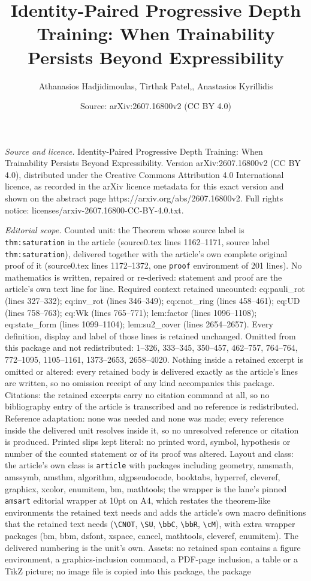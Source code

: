 \documentclass[10pt,a4paper]{amsart}
\title[Identity-Paired Progressive Depth Training: When Trainabilit]{Identity-Paired Progressive Depth Training: When Trainability Persists Beyond Expressibility}
\author{Athanasios Hadjidimoulas, Tirthak Patel,, Anastasios Kyrillidis}
\date{Source: arXiv:2607.16800v2 (CC BY 4.0)}
\begin{document}
\maketitle

\noindent\emph{Source and licence.} Identity-Paired Progressive Depth Training: When Trainability Persists Beyond Expressibility. Version arXiv:2607.16800v2 (CC BY 4.0), distributed under the Creative Commons Attribution 4.0 International licence, as recorded in the arXiv licence metadata for this exact version and shown on the abstract page https://arxiv.org/abs/2607.16800v2. Full rights notice: licenses/arxiv-2607.16800-CC-BY-4.0.txt.\par\smallskip

\noindent\textit{Editorial scope.} Counted unit: the Theorem whose source label is \texttt{thm:saturation} in the article (source0.tex lines 1162--1171, source label \texttt{thm:saturation}), delivered together with the article's own complete original proof of it (source0.tex lines 1172--1372, one \texttt{proof} environment of 201 lines). No mathematics is written, repaired or re-derived: statement and proof are the article's own text line for line. Required context retained uncounted: eq:pauli\_rot (lines 327--332); eq:inv\_rot (lines 346--349); eq:cnot\_ring (lines 458--461); eq:UD (lines 758--763); eq:Wk (lines 765--771); lem:factor (lines 1096--1108); eq:state\_form (lines 1099--1104); lem:su2\_cover (lines 2654--2657). Every definition, display and label of those lines is retained unchanged. Omitted from this package and not redistributed: 1--326, 333--345, 350--457, 462--757, 764--764, 772--1095, 1105--1161, 1373--2653, 2658--4020. Nothing inside a retained excerpt is omitted or altered: every retained body is delivered exactly as the article's lines are written, so no omission receipt of any kind accompanies this package. Citations: the retained excerpts carry no citation command at all, so no bibliography entry of the article is transcribed and no reference is redistributed. Reference adaptation: none was needed and none was made; every reference inside the delivered unit resolves inside it, so no unresolved reference or citation is produced. Printed slips kept literal: no printed word, symbol, hypothesis or number of the counted statement or of its proof was altered. Layout and class: the article's own class is \texttt{article} with packages including geometry, amsmath, amssymb, amsthm, algorithm, algpseudocode, booktabs, hyperref, cleveref, graphicx, xcolor, enumitem, bm, mathtools; the wrapper is the lane's pinned \texttt{amsart} editorial wrapper at 10pt on A4, which restates the theorem-like environments the retained text needs and adds the article's own macro definitions that the retained text needs (\texttt{\textbackslash CNOT}, \texttt{\textbackslash SU}, \texttt{\textbackslash bbC}, \texttt{\textbackslash bbR}, \texttt{\textbackslash cM}), with extra wrapper packages (bm, bbm, dsfont, xspace, cancel, mathtools, cleveref, enumitem). The delivered numbering is the unit's own. Assets: no retained span contains a figure environment, a graphics-inclusion command, a PDF-page inclusion, a table or a TikZ picture; no image file is copied into this package, the package 
\end{document}
